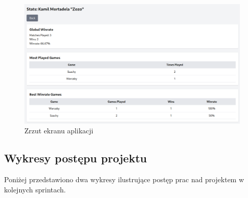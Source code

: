\documentclass[12pt,a4paper]{article}
\begin{document}
\begin{figure}[h!]
	\centering
	\includegraphics[width=1\linewidth]{media/screenshot001}
	\caption{Zrzut ekranu aplikacji}
	\label{fig:screenshot001}
\end{figure}

	
\pagebreak
\subsection{Wykresy postępu projektu}
Poniżej przedstawiono dwa wykresy ilustrujące postęp prac nad projektem w kolejnych sprintach.
\end{document}
